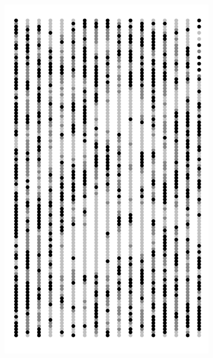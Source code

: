 \documentclass{uwstat572}
\begin{document}
\begin{figure}[H]
\begin{subfigure}[b]{0.24\textwidth}
		\includegraphics[width=\textwidth]{figures/figure_5c.png}
		\caption{}
		\label{fig:week_50}
	\end{subfigure}
	\hfill
	\begin{subfigure}[b]{0.24\textwidth}

\end{subfigure}
\end{figure}
\end{document}
